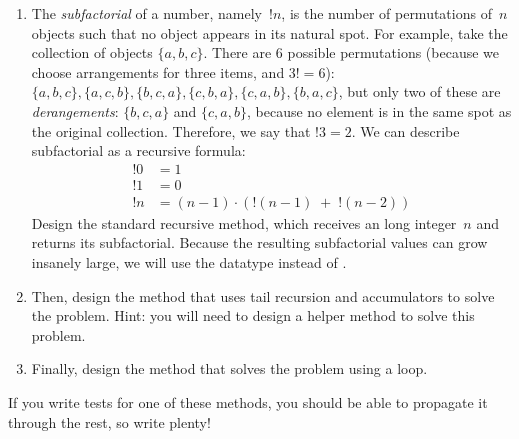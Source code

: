 
\begin{enumerate}[label=(\alph*)]
    \item The \emph{subfactorial} of a number, namely~$!n$, is the number of permutations of~$n$ objects such that no object appears in its natural spot. For example, take the collection of objects $\{a, b, c\}$. There are $6$ possible permutations (because we choose arrangements for three items, and $3!=6$): $\{a, b, c\}, \{a, c, b\}, \{b, c, a\}, \{c, b, a\}, \{c, a, b\}, \{b, a, c\}$, but only two of these are \emph{derangements}: $\{b, c, a\}$ and $\{c, a, b\}$, because no element is in the same spot as the original collection. Therefore, we say that $!3=2$. We can describe subfactorial as a recursive formula:
\begin{align*}
    !0 &= 1\\
    !1 &= 0\\
    !n &= (n-1) \cdot (!(n - 1)\;+\;!(n - 2))
\end{align*}
    Design the standard recursive  method, which receives an long integer~$n$ and returns its subfactorial. Because the resulting subfactorial values can grow insanely large, we will use the  datatype instead of .
    \item Then, design the  method that uses tail recursion and accumulators to solve the problem. Hint: you will need to design a  helper method to solve this problem.
    \item Finally, design the  method that solves the problem using a loop.
\end{enumerate}

If you write tests for one of these methods, you should be able to propagate it through the rest, so write plenty!

